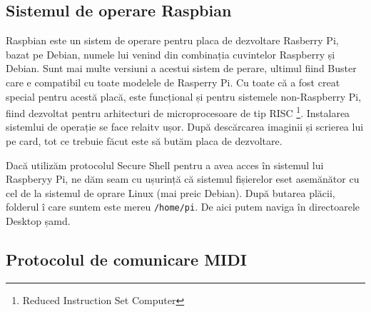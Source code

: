 \documentclass[../IoMusT.tex]{subfiles}
\begin{document}
\subsection{Sistemul de operare Raspbian}
Raspbian este un sistem de operare pentru placa de dezvoltare Rasberry Pi, bazat pe Debian, numele lui venind din combinația cuvintelor Raspberry și Debian. Sunt mai multe versiuni a acestui sistem de perare, ultimul fiind Buster care e compatibil cu toate modelele de Rasperry Pi. Cu toate că a fost creat special pentru acestă placă, este funcțional și pentru sistemele non-Raspberry Pi, fiind dezvoltat pentru arhitecturi de microprocesoare de tip RISC \footnote{Reduced Instruction Set Computer}. Instalarea sistemlui de operație se face relaitv ușor. După descărcarea imaginii și scrierea lui pe card, tot ce trebuie făcut este să butăm placa de dezvoltare. 
\\
\par Dacă utilizăm protocolul Secure Shell pentru a avea acces în sistemul lui Raspberyy Pi, ne dăm seam cu ușurință că sistemul fișierelor eset asemănător cu cel de la sistemul de oprare Linux (mai preic Debian). După butarea plăcii, folderul î care suntem este mereu \verb|/home/pi|. De aici putem naviga în directoarele Desktop șamd. 
\subsection{Protocolul de comunicare MIDI}
\end{document}
